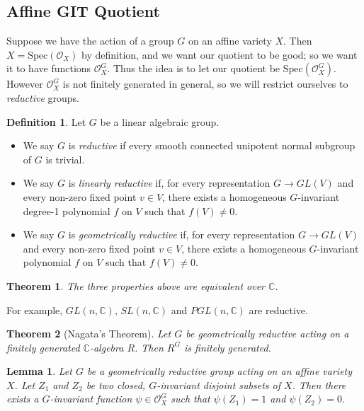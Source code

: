 \documentclass{article}
\newtheorem{thm}{Theorem}
\newtheorem{lemma}{Lemma}
\theoremstyle{definition}
\newtheorem{defn}{Definition}
\newcommand{\C}{\mathbb{C}}
\newcommand{\OO}{\mathcal{O}}
\newcommand{\Spec}{\text{Spec}}
\begin{document}
\subsection{Affine GIT Quotient}
Suppose we have the action of a group $G$ on an affine variety $X$. Then $X=\Spec(\OO_X)$ by definition, and we want our quotient to be good; so we want it to have functions $\OO_X^G$. Thus the idea is to let our quotient be $\Spec(\OO_X^G)$. However $\OO_X^G$ is not finitely generated in general, so we will restrict ourselves to \emph{reductive} groups.
\begin{defn}
	Let $G$ be a linear algebraic group.
	\begin{itemize}
		\item We say $G$ is \emph{reductive} if every smooth connected unipotent normal subgroup of $G$ is trivial.
		\item We say $G$ is \emph{linearly reductive} if, for every representation $G\to GL(V)$ and every non-zero fixed point $v\in V$, there exists a homogeneous $G$-invariant degree-1 polynomial $f$ on $V$ such that $f(V)\neq 0$.
		\item We say $G$ is \emph{geometrically reductive} if, for every representation $G\to GL(V)$ and every non-zero fixed point $v\in V$, there exists a homogeneous $G$-invariant polynomial $f$ on $V$ such that $f(V) \neq 0$.
	\end{itemize}
\end{defn}
\begin{thm}
	The three properties above are equivalent over $\C$. 
\end{thm}
For example, $GL(n,\C)$, $SL(n,\C)$ and $PGL(n,\C)$ are reductive.
\begin{thm}[Nagata's Theorem]
	Let $G$ be geometrically reductive acting on a finitely generated $\C$-algebra $R$. Then $R^G$ is finitely generated. 
\end{thm}
\begin{lemma}
	Let $G$ be a geometrically reductive group acting on an affine variety $X$. Let $Z_1$ and $Z_2$ be two closed, $G$-invariant disjoint subsets of $X$. Then there exists a $G$-invariant function $\psi\in\OO_X^G$ such that $\psi(Z_1)=1$ and $\psi(Z_2)=0$.
\end{lemma}
\end{document}
